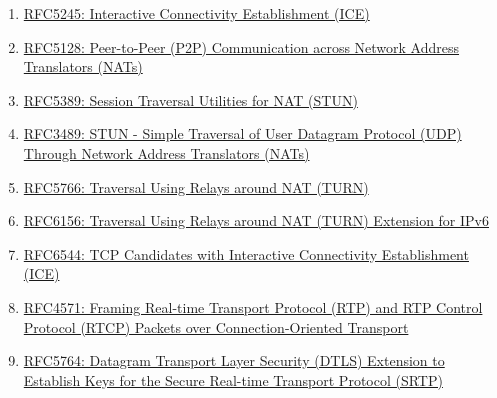 \documentclass{acmtog} %
\begin{document}
\begin{enumerate}
\begin{enumerate}
    \item \href{https://tools.ietf.org/html/rfc5245}{RFC5245: Interactive Connectivity Establishment (ICE)}
    \item \href{https://tools.ietf.org/html/rfc5128}{RFC5128: Peer-to-Peer (P2P) Communication across Network Address Translators (NATs)}
    \item \href{https://tools.ietf.org/html/rfc5389}{RFC5389: Session Traversal Utilities for NAT (STUN)}
    \item \href{https://tools.ietf.org/html/rfc3489}{RFC3489: STUN - Simple Traversal of User Datagram Protocol (UDP) Through Network Address Translators (NATs)}
    \item \href{https://tools.ietf.org/html/rfc5766}{RFC5766: Traversal Using Relays around NAT (TURN)}
    \item \href{https://tools.ietf.org/html/rfc6156}{RFC6156: Traversal Using Relays around NAT (TURN) Extension for IPv6}
    \item \href{https://tools.ietf.org/html/rfc6544}{RFC6544: TCP Candidates with Interactive Connectivity  Establishment (ICE)}
    \item \href{https://tools.ietf.org/html/RFC4571}{RFC4571: Framing Real-time Transport Protocol (RTP) and RTP Control Protocol (RTCP) Packets over Connection-Oriented Transport}
    \item \href{https://tools.ietf.org/html/rfc5764}{RFC5764: Datagram Transport Layer Security (DTLS) Extension to Establish Keys for the Secure Real-time Transport Protocol (SRTP)}
    \end{enumerate}


\end{enumerate}
\end{document}
